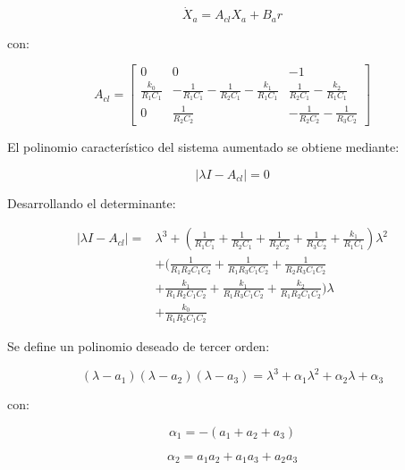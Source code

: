 \documentclass[12pt,letterpaper,twoside]{article}
\begin{document}
\begin{equation}
\dot{X}_a = A_{cl}X_a + B_ar
\end{equation}

con:

\begin{equation}
A_{cl} =
\begin{bmatrix}
0 & 0 & -1 \\
\frac{k_0}{R_1C_1} &
-\frac{1}{R_1C_1}-\frac{1}{R_2C_1}-\frac{k_1}{R_1C_1} &
\frac{1}{R_2C_1}-\frac{k_2}{R_1C_1} \\
0 &
\frac{1}{R_2C_2} &
-\frac{1}{R_2C_2}-\frac{1}{R_3C_2}
\end{bmatrix}
\end{equation}

El polinomio característico del sistema aumentado se obtiene mediante:

\begin{equation}
\left| \lambda I-A_{cl} \right| = 0
\end{equation}

Desarrollando el determinante:

\begin{equation}
\begin{aligned}
\left| \lambda I-A_{cl} \right| =
&\lambda^3
+
\left(
\frac{1}{R_1C_1}
+
\frac{1}{R_2C_1}
+
\frac{1}{R_2C_2}
+
\frac{1}{R_3C_2}
+
\frac{k_1}{R_1C_1}
\right)\lambda^2 \\
&+
\Bigg(
\frac{1}{R_1R_2C_1C_2}
+
\frac{1}{R_1R_3C_1C_2}
+
\frac{1}{R_2R_3C_1C_2}\\
&+
\frac{k_1}{R_1R_2C_1C_2}
+
\frac{k_1}{R_1R_3C_1C_2}
+
\frac{k_2}{R_1R_2C_1C_2}
\Bigg)\lambda \\
&+
\frac{k_0}{R_1R_2C_1C_2}
\end{aligned}
\end{equation}

Se define un polinomio deseado de tercer orden:

\begin{equation}
(\lambda-a_1)(\lambda-a_2)(\lambda-a_3)
=
\lambda^3 + \alpha_1\lambda^2 + \alpha_2\lambda + \alpha_3
\end{equation}

con:

\begin{equation}
\alpha_1 = -(a_1+a_2+a_3)
\end{equation}

\begin{equation}
\alpha_2 = a_1a_2+a_1a_3+a_2a_3
\end{equation}
\end{document}

